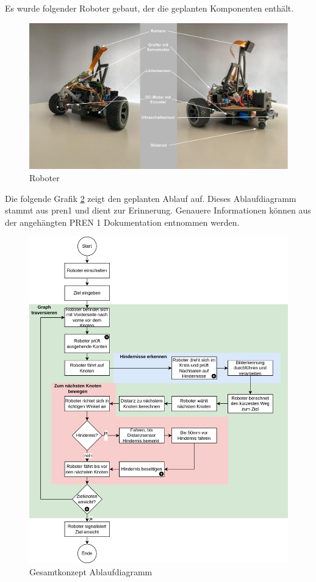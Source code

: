 Es wurde folgender Roboter gebaut, der die geplanten Komponenten enthält.

\begin{figure}[H]
\centering
\includegraphics[width=\textwidth]{assets/robo-labeled.jpg}
\caption{Roboter}
\label{fig:robo-labeled}
\end{figure}

Die folgende Grafik \ref{fig:ablauf} zeigt den geplanten Ablauf auf. Dieses Ablaufdiagramm stammt aus \acrshort{pren1} und dient zur Erinnerung. Genauere Informationen können aus der angehängten PREN 1 Dokumentation entnommen werden.

\begin{figure}[H]
\centering
\includegraphics[width=\textwidth]{assets/gesamtkonzept/ablaufdiagramm.png}
\caption{Gesamtkonzept Ablaufdiagramm}
\label{fig:ablauf}
\end{figure}


